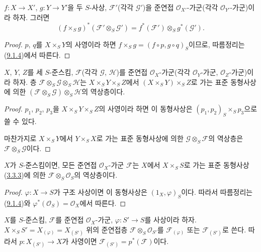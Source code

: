 \begin{corollary}[9.1.5]
\label{I.9.1.5-ko}
$f:X\to X'$, $g:Y\to Y'$을 두 $S$-사상, $\mathscr{F}'$(각각
$\mathscr{G}'$)을 준연접 $\mathscr{O}_{X'}$-가군(각각
$\mathscr{O}_{Y'}$-가군)이라 하자. 그러면
\[
  (f\times_S g)^*(\mathscr{F}'\otimes_S\mathscr{G}')
  =f^*(\mathscr{F}')\otimes_S g^*(\mathscr{G}').
\]
\end{corollary}

\begin{proof}
$p$, $q$를 $X\times_S Y$의 사영이라 하면
$f\times_S g=(f\circ p,g\circ q)_S$이므로, 따름정리는
(\hyperref[I.9.1.4-ko]{9.1.4})에서 따른다.
\end{proof}

\begin{corollary}[9.1.6]
\label{I.9.1.6-ko}
$X$, $Y$, $Z$를 세 $S$-준스킴, $\mathscr{F}$(각각 $\mathscr{G}$,
$\mathscr{H}$)를 준연접 $\mathscr{O}_X$-가군(각각
$\mathscr{O}_Y$-가군, $\mathscr{O}_Z$-가군)이라 하자. 층
$\mathscr{F}\otimes_S\mathscr{G}\otimes_S\mathscr{H}$는
$X\times_S Y\times_S Z$에서 $(X\times_S Y)\times_S Z$로 가는 표준
동형사상에 의한
$(\mathscr{F}\otimes_S\mathscr{G})\otimes_S\mathscr{H}$의 역상층이다.
\end{corollary}

\begin{proof}
$p_1$, $p_2$, $p_3$을 $X\times_S Y\times_S Z$의 사영이라 하면 이
동형사상은 $(p_1,p_2)_S\times_S p_3$으로 쓸 수 있다.

마찬가지로 $X\times_S Y$에서 $Y\times_S X$로 가는 표준 동형사상에
의한 $\mathscr{G}\otimes_S\mathscr{F}$의 역상층은
$\mathscr{F}\otimes_S\mathscr{G}$이다.
\end{proof}

\begin{corollary}[9.1.7]
\label{I.9.1.7-ko}
$X$가 $S$-준스킴이면, 모든 준연접 $\mathscr{O}_X$-가군
$\mathscr{F}$는 $X$에서 $X\times_S S$로 가는 표준 동형사상
(\hyperref[I.3.3.3-ko]{3.3.3})에 의한
$\mathscr{F}\otimes_S\mathscr{O}_S$의 역상층이다.
\end{corollary}

\begin{proof}
$\varphi:X\to S$가 구조 사상이면 이 동형사상은 $(1_X,\varphi)_S$이다.
따라서 따름정리는 (\hyperref[I.9.1.4-ko]{9.1.4})와
$\varphi^*(\mathscr{O}_S)=\mathscr{O}_X$에서 따른다.
\end{proof}

\begin{env}[9.1.8]
\label{I.9.1.8-ko}
$X$를 $S$-준스킴, $\mathscr{F}$를 준연접 $\mathscr{O}_X$-가군,
$\varphi:S'\to S$를 사상이라 하자. $X\times_S S'
=X_{(\varphi)}=X_{(S')}$ 위의 준연접층
$\mathscr{F}\otimes_S\mathscr{O}_{S'}$를
$\mathscr{F}_{(\varphi)}$ 또는 $\mathscr{F}_{(S')}$로 쓴다. 따라서
$p:X_{(S')}\to X$가 사영이면
$\mathscr{F}_{(S')}=p^*(\mathscr{F})$이다.
\end{env}


